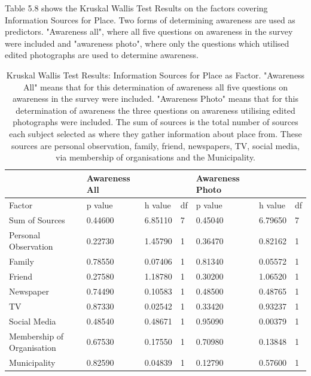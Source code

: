 Table 5.8 shows the Kruskal Wallis Test Results on the factors covering Information Sources for Place. Two forms of determining awareness are used as predictors. "Awareness all", where all five questions on awareness in the survey were included and "awareness photo", where only the questions which utilised edited photographs are used to determine awareness.

\begin{table}[H]
    \centering
    \begin{tabular}{|l|l|l|l|l|l|l|}
    \hline
       & \textbf{Awareness All} & ~ & ~ & \textbf{Awareness Photo} & ~ & ~ \\ \hline
       Factor & p value & h value & df & p value & h value & df \\ \hline
        Sum of Sources  & 0.44600 & 6.85110 & 7 & 0.45040 & 6.79650 & 7 \\ \hline
        Personal Observation & 0.22730 & 1.45790 & 1 & 0.36470 & 0.82162 & 1 \\ \hline
        Family & 0.78550 & 0.07406 & 1 & 0.81340 & 0.05572 & 1 \\ \hline
        Friend & 0.27580 & 1.18780 & 1 & 0.30200 & 1.06520 & 1 \\ \hline
        Newspaper & 0.74490 & 0.10583 & 1 & 0.48500 & 0.48765 & 1 \\ \hline
        TV & 0.87330 & 0.02542 & 1 & 0.33420 & 0.93237 & 1 \\ \hline
        Social Media & 0.48540 & 0.48671 & 1 & 0.95090 & 0.00379 & 1 \\ \hline
        Membership of Organisation  & 0.67530 & 0.17550 & 1 & 0.70980 & 0.13848 & 1 \\ \hline
        Municipality & 0.82590 & 0.04839 & 1 & 0.12790 & 0.57600 & 1 \\ \hline
        \hline
    \end{tabular}
    \caption{Kruskal Wallis Test Results: Information Sources for Place as Factor. "Awareness All" means that for this determination of awareness all five questions on awareness in the survey were included. "Awareness Photo" means that for this determination of awareness the three questions on awareness utilising edited photographs were included. The sum of sources is the total number of sources each subject selected as where they gather information about place from. These sources are personal observation, family, friend, newspapers, TV, social media, via membership of organisations and the Municipality. }
    \label{Kruskal_wallis_test_information}
\end{table}

